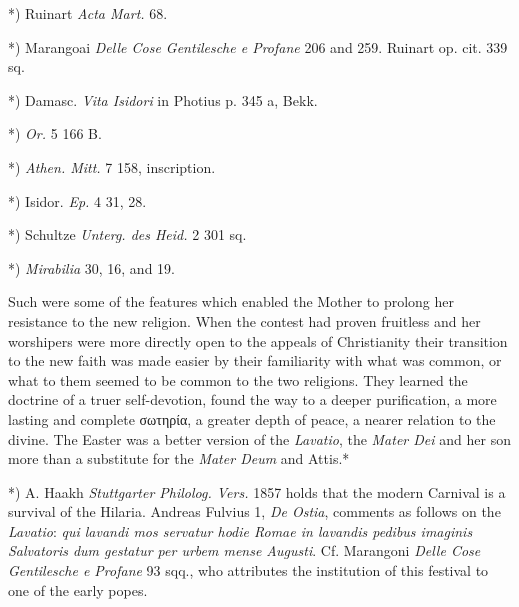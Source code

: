 \documentclass[a4paper, 11pt, oneside, polutonikogreek, english]{article}
\begin{document}
*) Ruinart \emph{Acta Mart.} 68.

*) Marangoai \emph{Delle Cose Gentilesche e Profane} 206 and 259. Ruinart op. cit. 339 sq.

*) Damasc. \emph{Vita Isidori} in Photius p. 345 a, Bekk.

*) \emph{Or.} 5 166 B.

*) \emph{Athen. Mitt.} 7 158, inscription.

*) Isidor. \emph{Ep.} 4 31, 28.

*) Schultze \emph{Unterg. des Heid.} 2 301 sq.

*) \emph{Mirabilia} 30, 16, and 19.

Such were some of the features which enabled the Mother to prolong her resistance to the new religion. When the contest had proven fruitless and her worshipers were more directly open to the appeals of Christianity their transition to the new faith was made easier by their familiarity with what was common, or what to them seemed to be common to the two religions. They learned the doctrine of a truer self-devotion, found the way to a deeper purification, a more lasting and complete σωτηρία, a greater depth of peace, a nearer relation to the divine. The Easter was a better version of the \emph{Lavatio}, the \emph{Mater Dei} and her son more than a substitute for the \emph{Mater Deum} and Attis.*

*) A. Haakh \emph{Stuttgarter Philolog. Vers.} 1857 holds that the modern Carnival is a survival of the Hilaria. Andreas Fulvius 1, \emph{De Ostia}, comments as follows on the \emph{Lavatio}: \emph{qui lavandi mos servatur hodie Romae in lavandis pedibus imaginis Salvatoris dum gestatur per urbem mense Augusti}. Cf. Marangoni \emph{Delle Cose Gentilesche e Profane} 93 sqq., who attributes the institution of this festival to one of the early popes.
\clearpage
\end{document}
